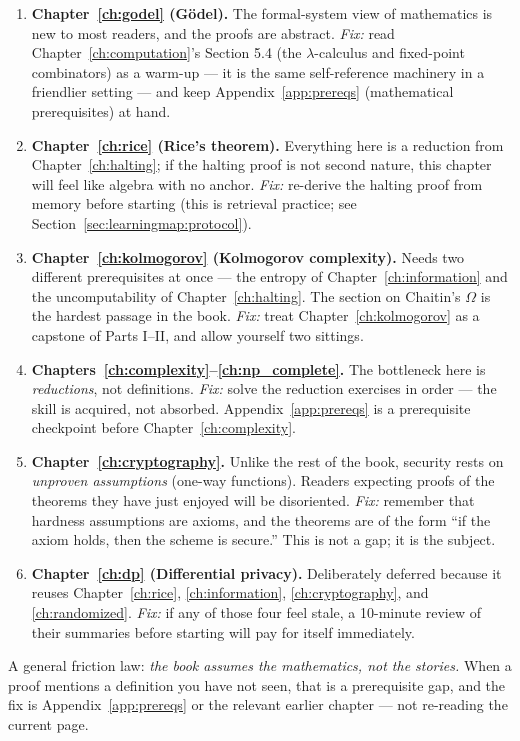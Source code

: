 \begin{enumerate}
\item \textbf{Chapter~\ref{ch:godel} (G\"odel).} The formal-system view of mathematics is new to most readers, and the proofs are abstract. \emph{Fix:} read Chapter~\ref{ch:computation}'s Section 5.4 (the $\lambda$-calculus and fixed-point combinators) as a warm-up --- it is the same self-reference machinery in a friendlier setting --- and keep Appendix~\ref{app:prereqs} (mathematical prerequisites) at hand.
\item \textbf{Chapter~\ref{ch:rice} (Rice's theorem).} Everything here is a reduction from Chapter~\ref{ch:halting}; if the halting proof is not second nature, this chapter will feel like algebra with no anchor. \emph{Fix:} re-derive the halting proof from memory before starting (this is retrieval practice; see Section~\ref{sec:learningmap:protocol}).
\item \textbf{Chapter~\ref{ch:kolmogorov} (Kolmogorov complexity).} Needs two different prerequisites at once --- the entropy of Chapter~\ref{ch:information} and the uncomputability of Chapter~\ref{ch:halting}. The section on Chaitin's $\Omega$ is the hardest passage in the book. \emph{Fix:} treat Chapter~\ref{ch:kolmogorov} as a capstone of Parts I--II, and allow yourself two sittings.
\item \textbf{Chapters~\ref{ch:complexity}--\ref{ch:np_complete}.} The bottleneck here is \emph{reductions}, not definitions. \emph{Fix:} solve the reduction exercises in order --- the skill is acquired, not absorbed. Appendix~\ref{app:prereqs} is a prerequisite checkpoint before Chapter~\ref{ch:complexity}.
\item \textbf{Chapter~\ref{ch:cryptography}.} Unlike the rest of the book, security rests on \emph{unproven assumptions} (one-way functions). Readers expecting proofs of the theorems they have just enjoyed will be disoriented. \emph{Fix:} remember that hardness assumptions are axioms, and the theorems are of the form ``if the axiom holds, then the scheme is secure.'' This is not a gap; it is the subject.
\item \textbf{Chapter~\ref{ch:dp} (Differential privacy).} Deliberately deferred because it reuses Chapter~\ref{ch:rice}, \ref{ch:information}, \ref{ch:cryptography}, and \ref{ch:randomized}. \emph{Fix:} if any of those four feel stale, a 10-minute review of their summaries before starting will pay for itself immediately.
\end{enumerate}

A general friction law: \emph{the book assumes the mathematics, not the stories.} When a proof mentions a definition you have not seen, that is a prerequisite gap, and the fix is Appendix~\ref{app:prereqs} or the relevant earlier chapter --- not re-reading the current page.

